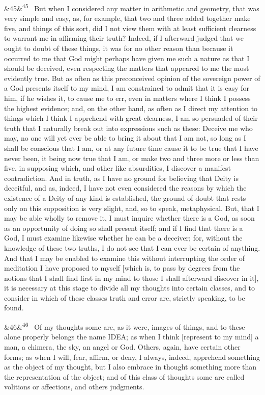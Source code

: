 \documentclass[12pt]{article}
\newcommand{\para}[1][]{\par\noindent\ifx&#1&\else\textsuperscript{\footnotesize #1}~\fi}
\begin{document}
\para[45] But when I considered any matter in arithmetic and geometry, that was very simple and easy, as, for example, that two and three added together make five, and things of this sort, did I not view them with at least sufficient clearness to warrant me in affirming their truth? Indeed, if I afterward judged that we ought to doubt of these things, it was for no other reason than because it occurred to me that God might perhaps have given me such a nature as that I should be deceived, even respecting the matters that appeared to me the most evidently true. But as often as this preconceived opinion of the sovereign power of a God presents itself to my mind, I am constrained to admit that it is easy for him, if he wishes it, to cause me to err, even in matters where I think I possess the highest evidence; and, on the other hand, as often as I direct my attention to things which I think I apprehend with great clearness, I am so persuaded of their truth that I naturally break out into expressions such as these: Deceive me who may, no one will yet ever be able to bring it about that I am not, so long as I shall be conscious that I am, or at any future time cause it to be true that I have never been, it being now true that I am, or make two and three more or less than five, in supposing which, and other like absurdities, I discover a manifest contradiction. And in truth, as I have no ground for believing that Deity is deceitful, and as, indeed, I have not even considered the reasons by which the existence of a Deity of any kind is established, the ground of doubt that rests only on this supposition is very slight, and, so to speak, metaphysical. But, that I may be able wholly to remove it, I must inquire whether there is a God, as soon as an opportunity of doing so shall present itself; and if I find that there is a God, I must examine likewise whether he can be a deceiver; for, without the knowledge of these two truths, I do not see that I can ever be certain of anything. And that I may be enabled to examine this without interrupting the order of meditation I have proposed to myself [which is, to pass by degrees from the notions that I shall find first in my mind to those I shall afterward discover in it], it is necessary at this stage to divide all my thoughts into certain classes, and to consider in which of these classes truth and error are, strictly speaking, to be found.

\para[46] Of my thoughts some are, as it were, images of things, and to these alone properly belongs the name IDEA; as when I think [represent to my mind] a man, a chimera, the sky, an angel or God. Others, again, have certain other forms; as when I will, fear, affirm, or deny, I always, indeed, apprehend something as the object of my thought, but I also embrace in thought something more than the representation of the object; and of this class of thoughts some are called volitions or affections, and others judgments.
\end{document}
